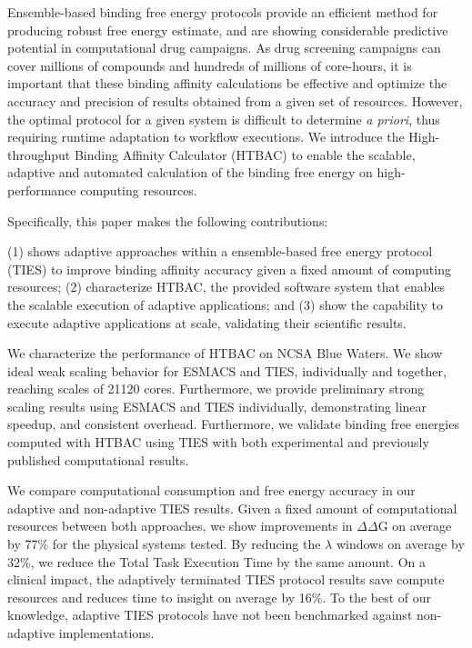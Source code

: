 Ensemble-based binding free energy protocols provide an efficient method for 
producing robust free energy estimate, and are showing considerable predictive 
potential in computational drug campaigns. As drug screening campaigns can 
cover millions of compounds and hundreds of millions of core-hours, it is 
important that these binding affinity calculations be effective and optimize the 
accuracy and precision of results obtained from a given set of resources. 
However, the optimal protocol for a given system is difficult to determine 
{\it a priori}, thus requiring runtime adaptation to workflow executions. We 
introduce the High-throughput Binding Affinity Calculator (HTBAC) to enable the 
scalable, adaptive and automated calculation of the binding free energy on 
high-performance computing resources.

Specifically, this paper makes the following contributions: 

(1) shows adaptive approaches within a ensemble-based free energy protocol (TIES) 
to improve binding affinity accuracy given a fixed amount of computing resources; 
(2) characterize HTBAC, the provided software system that enables the scalable
execution of adaptive applications; and (3) show the capability to execute
adaptive applications at scale, validating their scientific results.

We characterize the performance of HTBAC on NCSA Blue Waters. We show ideal 
weak scaling behavior for ESMACS and TIES, individually and together, reaching 
scales of 21120 cores. 
Furthermore, we provide preliminary strong scaling results using ESMACS and TIES 
individually, demonstrating linear speedup, and consistent overhead.  
Furthermore, we validate binding free energies computed with HTBAC using 
TIES with both experimental and previously published computational results. 

We compare computational consumption and free energy accuracy in our adaptive 
and non-adaptive TIES results. Given a fixed amount of computational resources 
between both approaches, we show improvements in $\Delta \Delta$G on 
average by 77\% for the physical systems tested. By reducing the $\lambda$ 
windows on average by 32\%, we reduce the Total Task Execution Time by the same 
amount. On a clinical impact, the adaptively terminated TIES protocol results 
save compute resources and reduces time to insight on average by 16\%. 
To the best of our knowledge, adaptive TIES 
protocols have not been benchmarked against non-adaptive implementations.

